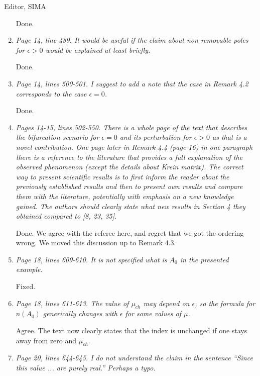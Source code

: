 \documentclass[11pt]{letter}
\begin{document}
\begin{letter}{Editor, SIMA}
\begin{enumerate}
Done.

\item \emph{Page 14, line 489. It would be useful if the claim about non-removable poles for $\epsilon > 0$ would be explained at least briefly.}
\vspace{4mm}

Done.

\item \emph{Page 14, lines 500-501. I suggest to add a note that the case in Remark 4.2 corresponds to the case $\epsilon = 0$.}
\vspace{4mm}

Done.

\item \emph{Pages 14-15, lines 502-550. There is a whole page of the text that describes the bifurcation scenario for $\epsilon = 0$ and its perturbation for $\epsilon > 0$ as that is a novel contribution. One page later in Remark 4.4 (page 16) in one paragraph there is a reference to the literature that provides a full explanation of the observed phenomenon (except the details about Krein matrix). The correct way to present scientific results is to first inform the reader about the previously established results and then to present own results and compare them with the literature, potentially with emphasis on a new knowledge gained. The authors should clearly state what new results in Section 4 they obtained compared to [8, 23, 35].}
\vspace{4mm}

Done.  We agree with the referee here, and regret that we got the ordering wrong.  We moved this discussion up to Remark 4.3.

\item \emph{Page 18, lines 609-610. It is not specified what is $A_0$ in the presented example.}
\vspace{4mm}

Fixed.

\item \emph{Page 18, lines 611-613. The value of $\mu_{ch}$ may depend on $\epsilon$, so the formula for $n(A_0)$ generically changes with $\epsilon$ for some values of $\mu$.}
\vspace{4mm}

Agree. The text now clearly states that the index is unchanged if one stays away from zero and $\mu_{ch}$.

\item \emph{Page 20, lines 644-645. I do not understand the claim in the sentence ``Since this value ... are purely real.'' Perhaps a typo.}
\vspace{4mm}


\end{enumerate}
\end{letter}
\end{document}
